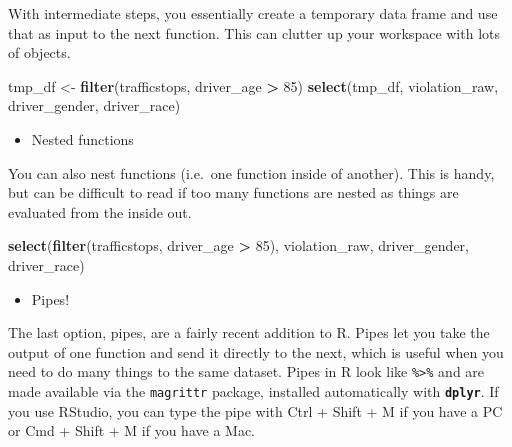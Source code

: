 \documentclass[]{book}
\newenvironment{Shaded}{\begin{snugshade}}{\end{snugshade}}
\newcommand{\DecValTok}[1]{\textcolor[rgb]{0.00,0.00,0.81}{#1}}
\newcommand{\KeywordTok}[1]{\textcolor[rgb]{0.13,0.29,0.53}{\textbf{#1}}}
\newcommand{\NormalTok}[1]{#1}
\newcommand{\OperatorTok}[1]{\textcolor[rgb]{0.81,0.36,0.00}{\textbf{#1}}}
\newcommand{\StringTok}[1]{\textcolor[rgb]{0.31,0.60,0.02}{#1}}
\providecommand{\tightlist}{%
  \setlength{\itemsep}{0pt}\setlength{\parskip}{0pt}}
\begin{document}
With intermediate steps, you essentially create a temporary data frame and use
that as input to the next function. This can clutter up your workspace with lots
of objects.

\begin{Shaded}
\begin{Highlighting}[]
\NormalTok{tmp_df <-}\StringTok{ }\KeywordTok{filter}\NormalTok{(trafficstops, driver_age }\OperatorTok{>}\StringTok{ }\DecValTok{85}\NormalTok{)}
\KeywordTok{select}\NormalTok{(tmp_df, violation_raw, driver_gender, driver_race)}
\end{Highlighting}
\end{Shaded}

\begin{itemize}
\tightlist
\item
  Nested functions
\end{itemize}

You can also nest functions (i.e.~one function inside of another).
This is handy, but can be difficult to read if too many functions are nested as things are evaluated from the inside out.

\begin{Shaded}
\begin{Highlighting}[]
\KeywordTok{select}\NormalTok{(}\KeywordTok{filter}\NormalTok{(trafficstops, driver_age }\OperatorTok{>}\StringTok{ }\DecValTok{85}\NormalTok{), violation_raw, driver_gender, driver_race)}
\end{Highlighting}
\end{Shaded}

\begin{itemize}
\tightlist
\item
  Pipes!
\end{itemize}

The last option, pipes, are a fairly recent addition to R. Pipes let you take
the output of one function and send it directly to the next, which is useful
when you need to do many things to the same dataset. Pipes in R look like
\texttt{\%\textgreater{}\%} and are made available via the \texttt{magrittr} package, installed automatically
with \textbf{\texttt{dplyr}}. If you use RStudio, you can type the pipe with Ctrl
+ Shift + M if you have a PC or Cmd +
Shift + M if you have a Mac.

\begin{Shaded}
\end{Shaded}
\end{document}
